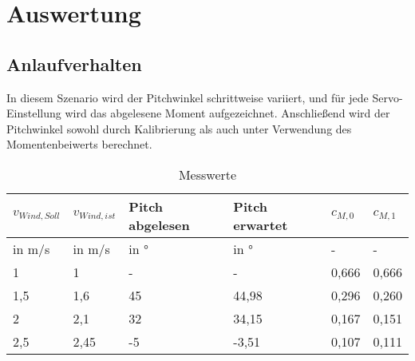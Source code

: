 \section{Auswertung}
\label{sec:Auswertung}
\subsection{Anlaufverhalten}
In diesem Szenario wird der Pitchwinkel schrittweise variiert, und für jede Servo-Einstellung  wird das abgelesene Moment aufgezeichnet. Anschließend wird der Pitchwinkel sowohl durch Kalibrierung als auch unter Verwendung des Momentenbeiwerts berechnet.
\begin{table}[H]
    \centering
    \caption{Messwerte}
    \label{tab_Messwerte_Anlauf_230615}
    \small
    \begin{tabular}{|l|l|l|l|l|l|}
        \hline
        \rowcolor[HTML]{70AD47} 
        {\color[HTML]{FFFFFF} \textbf{$v_{Wind,Soll}$}} & {\color[HTML]{FFFFFF} \textbf{$v_{Wind,ist}$}} & {\color[HTML]{FFFFFF} \textbf{Pitch abgelesen}} & {\color[HTML]{FFFFFF} \textbf{Pitch erwartet}} & {\color[HTML]{FFFFFF} \textbf{$c_{M,0}$}} & {\color[HTML]{FFFFFF} \textbf{$c_{M,1}$}} \\ \hline
        \rowcolor[HTML]{70AD47} 
        in m/s                                         & in m/s                                      & in °                                            & in °                                           & -                                      & -                                      \\ \hline
        \rowcolor[HTML]{E2EFDA} 
        1                                              & 1                                           & -                                               & -                                              & 0,666                                  & 0,666                                  \\ \hline
        \rowcolor[HTML]{C6E0B4} 
        1,5                                            & 1,6                                         & 45                                              & 44,98                                              & 0,296                                  & 0,260                                  \\ \hline
        \rowcolor[HTML]{E2EFDA} 
        2                                              & 2,1                                         & 32                                              & 34,15                                              & 0,167                                  & 0,151                                  \\ \hline
        \rowcolor[HTML]{C6E0B4} 
        2,5                                            & 2,45                                        & -5                                              & -3,51                                       & 0,107                                  & 0,111                                  \\ \hline
    \end{tabular}
\end{table}

